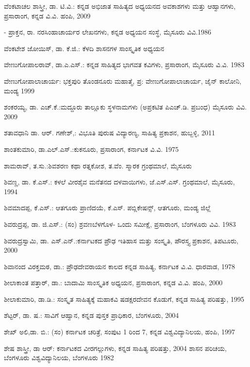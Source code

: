 \noindent
ವೆಂಕಟಾಚಲ ಶಾಸ್ತ್ರೀ, ಡಾ. ಟಿ.ವಿ.: ಕನ್ನಡ ಅಭಿಜಾತ ಸಾಹಿತ್ಯದ ಅಧ್ಯಯನದ ಅವಕಾಶಗಳು ಮತ್ತು ಆಹ್ವಾನಗಳು, ಪ್ರಸಾರಾಂಗ, ಕನ್ನಡ ವಿ.ವಿ. ಹಂಪಿ, 2009

- ಪ್ರಾಕ್ತನ, ರಾ. ನರಸಿಂಹಾಚಾರ್ಯರ ಲೇಖನಗಳು, ಕನ್ನಡ ಅಧ್ಯಯನ ಸಂಸ್ಥೆ, ಮೈಸೂರು ವಿವಿ.1986

\noindent
ವೆಂಕಟೇಶ ಜೋಯಿಸ್​, ಡಾ. ಕೆ.ಜಿ.: ಕೆಳದಿ ಶಾಸನಗಳ ಸಾಂಸ್ಕೃತಿಕ ಅಧ್ಯಯನ

\noindent
ವೇಣುಗೋಪಾಲರಾವ್​, ಡಾ.ಎ.ಎಸ್​.: ಕನ್ನಡ ಸಾಹಿತ್ಯದ ಭಾಗವತ ಕವಿಗಳು, ಪ್ರಸಾರಾಂಗ, ಮೈಸೂರು ವಿ.ವಿ. 1983

\noindent
ವೇಣುಗೋಪಾಲಾಚಾರ್ಯ: ಭಕ್ತಪುರಿ ತೊಂಡನೂರು ಮಹಾತ್ಮೆ, ಪ್ರ: ವೇಣುಗೋಪಾಲಾಚಾರ್ಯ, ಜೈನ್​ ಕಾಲೋನಿ, ಮಂಡ್ಯ 1999

\noindent
ಶಂಕರಯ್ಯ, ಡಾ. ಎಚ್​.ಕೆ.:ಮದ್ದೂರು ತಾಲ್ಲೂಕು ಸ್ಥಳನಾಮಗಳು (ಅಪ್ರಕಟಿತ ಪಿಎಚ್​.ಡಿ. ಪ್ರಬಂಧ) ಮೈಸೂರು ವಿವಿ. 2009

\noindent
ಶತಾವಧಾನಿ ಡಾ. ಆರ್​. ಗಣೇಶ್​,: ವಿಭೂತಿ ಪುರುಷ ವಿದ್ಯಾರಣ್ಯ, ಸಾಹಿತ್ಯ ಪ್ರಕಾಶನ, ಹುಬ್ಬಳ್ಳಿ, 2011

\noindent
ಶಾಂತಕುಮಾರಿ, ಡಾ.ಎಲ್​.ಎಸ್​.:ಕುಕನೂರು, ಪ್ರಸಾರಾಂಗ, ಕರ್ನಾಟಕ ವಿ.ವಿ. 1975

\noindent
ಶಾಮರಾವ್​, ತ.ಸು.:ಶಿವಶರಣ ಕಥಾ ರತ್ನಕೋಶ, ತ.ವೆಂ. ಸ್ಮಾರಕ ಗ್ರಂಥಮಾಲೆ, ಮೈಸೂರು

\noindent
ಶಿವಣ್ಣ, ಡಾ. ಕೆ.ಎಸ್​.: ಕಳಲೆ ವೀರಶೈವ ಮನೆತನದ ದಳವಾಯಿಗಳು, ಜೆ.ಎಸ್​.ಎಸ್​. ಗ್ರಂಥಮಾಲೆ, ಮೈಸೂರು, 1994

\noindent
ಶಿವಮಾದಪ್ಪ, ಕೆ.ಎಸ್​.: ಆತಗೂರು ಪ್ರಾಣಿದಯೆ, ಕೆ.ಎಸ್​. ಪಬ್ಲಿಕೇಷನ್ಸ್​, ಆತಗೂರು, ಮಂಡ್ಯ ಜಿಲ್ಲೆ

\noindent
ಶಿವರುದ್ರಪ್ಪ, ಡಾ. ಜಿ.ಎಸ್​.: (ಸಂ) ಶ್ರವಣಬೆಳಗೊಳ- ಒಂದು ಸಮೀಕ್ಷೆ, ಪ್ರಸಾರಾಂಗ, ಬೆಂಗಳೂರು ವಿವಿ. 1983

\noindent
ಶಿವರುದ್ರಸ್ವಾಮಿ, ಡಾ. ಎಸ್​.ಎನ್​.:ಕರ್ನಾಟಕದ ಪ್ರೌಢ ಇತಿಹಾಸ ಮತ್ತು ಸಂಸ್ಕೃತಿ, ಪೌರಸ್ತ್ಯ ಪ್ರಕಾಶನ, ತಿಪಟೂರು, 2000

\noindent
ಶಿವಾನಂದ ವಿರಕ್ತಮಠ, ಡಾ.: ಪ್ರೌಢದೇವರಾಯನ ಕಾಲದ ಕನ್ನಡ ಸಾಹಿತ್ಯ, ಕರ್ನಾಟಕ ವಿ.ವಿ. ಧಾರವಾಡ, 1978

\noindent
ಶೀಲಾಕಾಂತ ಪತ್ತಾರ್​, ಡಾ.: ಬಾದಾಮಿ ಸಾಂಸ್ಕೃತಿಕ ಅಧ್ಯಯನ, ಪ್ರಸಾರಾಂಗ, ಕನ್ನಡ ವಿ.ವಿ. ಹಂಪಿ, 2000

\noindent
ಶೀಲಾಕುಮಾರಿ, ಡಾ.ಡಿ.: ಸಂಸ್ಕೃತ ಸಾಹಿತ್ಯಕ್ಕೆ ಮಹಾಕವಿ ಷಡಕ್ಷರದೇವನ ಕೊಡುಗೆ, ಕನ್ನಡ ಸಾಹಿತ್ಯ ಪರಿಷತ್ತು, 1995

\noindent
ಶೆಟ್ಟರ್​, ಡಾ. ಷ.: ಸಾವಿಗೆ ಆಹ್ವಾನ, ಕನ್ನಡ ಪುಸ್ತಕ ಪ್ರಾಧಿಕಾರ, ಬೆಂಗಳೂರು, 2004

\noindent
ಶೇಖ್​ ಅಲಿ,ಡಾ. ಬಿ.: (ಸಂ) ಕರ್ನಾಟಕ ಚರಿತ್ರೆ, ಸಂಪುಟ 1 ರಿಂದ 7, ಕನ್ನಡ ವಿಶ್ವವಿದ್ಯಾನಿಲಯ, ಹಂಪಿ, 1997

\noindent
ಶೇಷ ಶಾಸ್ತ್ರೀ, ಡಾ ಆರ್​: ಕರ್ನಾಟಕದ ವೀರಗಲ್ಲುಗಳು, ಕನ್ನಡ ಸಾಹಿತ್ಯ ಪರಿಷತ್ತು, 2004 ಶಾಸನ ಪರಿಚಯ, ಬೆಂಗಳೂರು ವಿಶ್ವವಿದ್ಯಾನಿಲಯ, ಬೆಂಗಳೂರು 1982

